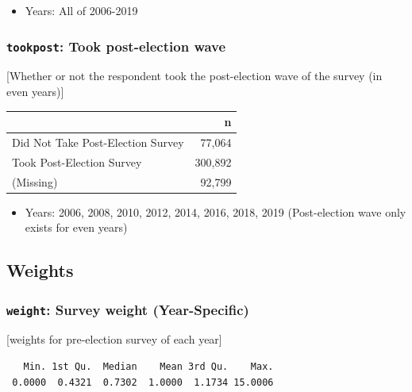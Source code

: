 \documentclass[10pt,article,oneside]{memoir}
\theoremstyle{definition}
\begin{document}
\begin{itemize}
\tightlist
\item
  Years: All of 2006-2019
\end{itemize}

\hypertarget{tookpost-took-post-election-wave}{%
\subsubsection{\texorpdfstring{\texttt{tookpost}: Took post-election
wave}{tookpost: Took post-election wave}}\label{tookpost-took-post-election-wave}}

{[}Whether or not the respondent took the post-election wave of the
survey (in even years){]}

\begin{table}[H]
\centering
\begin{tabular}{lr}
\toprule
 & n\\
\midrule
Did Not Take Post-Election Survey & 77,064\\
Took Post-Election Survey & 300,892\\
(Missing) & 92,799\\
\bottomrule
\end{tabular}
\end{table}

\begin{itemize}
\tightlist
\item
  Years: 2006, 2008, 2010, 2012, 2014, 2016, 2018, 2019 (Post-election
  wave only exists for even years)
\end{itemize}

\hypertarget{weights}{%
\subsection{Weights}\label{weights}}

\hypertarget{weight-survey-weight-year-specific}{%
\subsubsection{\texorpdfstring{\texttt{weight}: Survey weight
(Year-Specific)}{weight: Survey weight (Year-Specific)}}\label{weight-survey-weight-year-specific}}

{[}weights for pre-election survey of each year{]}

\begin{verbatim}
   Min. 1st Qu.  Median    Mean 3rd Qu.    Max. 
 0.0000  0.4321  0.7302  1.0000  1.1734 15.0006 
\end{verbatim}
\end{document}
